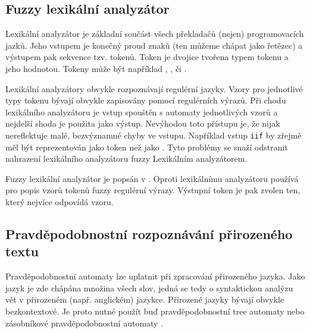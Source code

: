 \documentclass[a4paper,10pt]{article}
\begin{document}
\subsection{Fuzzy lexikální analyzátor}
Lexikální analyzátor je základní součást všech překladačů (nejen) programovacích jazků. Jeho vstupem je konečný proud znaků (ten můžeme chápat jako řetězec) a výstupem pak sekvence tzv. tokenů. Token je dvojice tvořena typem tokenu a jeho hodnotou. Tokeny může být například , ,  či .

Lexikální analyzátory obvykle rozpoznávají regulérní jazyky. Vzory pro jednotlivé typy tokenu bývají obvykle zapisovány pomocí regulérních výrazů. Při chodu lexikálního analyzátoru je vstup spouštěn s automaty jednotlivých vzorů a nejdelší shoda je použita jako výstup. Nevýhodou toto přístupu je, že nijak nereflektuje malé, bezvýznamné chyby ve vstupu. Například vstup \texttt{iif} by zřejmě měl být reprezentován jako token  než jako . Tyto problémy se snaží odstranit nahrazení  lexikálního analyzátoru fuzzy Lexikálním analyzátorem.

Fuzzy lexikální analyzátor je popsán v \cite{MatSalSalYu-LexAnaSimFinFuzAutMod}. Oproti  lexikálnímu analyzátoru používá pro popis vzorů tokenů fuzzy regulérní výrazy. Výstupní token je pak zvolen ten, který nejvíce odpovídá vzoru.


\subsection{Pravděpodobnostní rozpoznávání přirozeného textu}
Pravděpodobnostní automaty lze uplatnit při zpracování přirozeného jazyka. Jako jazyk je zde chápána množina všech slov, jedná se tedy o syntaktickou analýzu vět v přirozeném (např. anglickém) jazykce. Přirozené jazyky bývají obvykle bezkontextové. Je proto nutné použít buď pravděpodobnostní tree automaty \cite{KniGra-OvProTreTraNatLanPro} nebo zásobníkové pravděpodobnostní automaty \cite{WaMan-ProFiStMaRegBaMTEva}.
\end{document}
